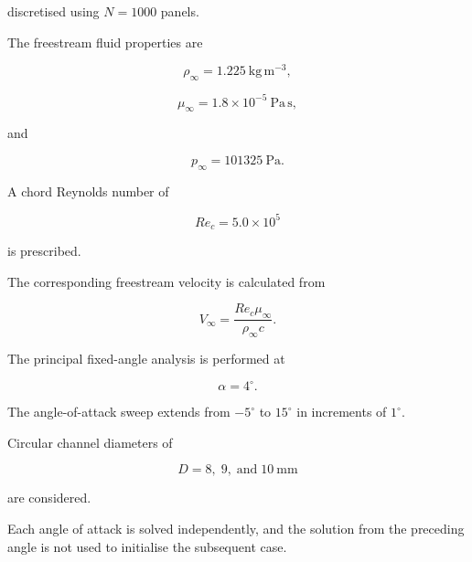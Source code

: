 \documentclass[a4paper,fleqn]{cas-dc}
\begin{document}
discretised using $N=1000$ panels.

The freestream fluid properties are

\begin{equation}
	\rho_{\infty}
	=
	1.225~\mathrm{kg\,m^{-3}},
\end{equation}

\begin{equation}
	\mu_{\infty}
	=
	1.8\times10^{-5}~\mathrm{Pa\,s},
\end{equation}

and

\begin{equation}
	p_{\infty}
	=
	101325~\mathrm{Pa}.
\end{equation}

A chord Reynolds number of

\begin{equation}
	Re_c
	=
	5.0\times10^5
\end{equation}

is prescribed.

The corresponding freestream velocity is calculated from

\begin{equation}
	V_{\infty}
	=
	\frac{
		Re_c\mu_{\infty}}
	{\rho_{\infty}c}.
	\label{eq:freestream_velocity}
\end{equation}

The principal fixed-angle analysis is performed at

\begin{equation}
	\alpha
	=
	4^\circ.
\end{equation}

The angle-of-attack sweep extends from $-5^\circ$ to $15^\circ$ in
increments of $1^\circ$.

Circular channel diameters of

\begin{equation}
	D
	=
	8,\;9,\;\text{and}\;10~\mathrm{mm}
\end{equation}

are considered.

Each angle of attack is solved independently, and the solution from the
preceding angle is not used to initialise the subsequent case.
\end{document}
